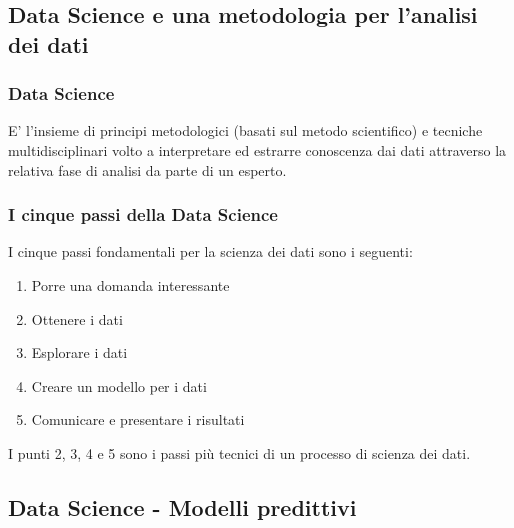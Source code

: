 \documentclass[../main.tex]{subfiles}
\begin{document}
	\subsection{Data Science e una metodologia per l’analisi dei dati}
	\subsubsection{Data Science}
	E’ l’insieme di principi metodologici (basati sul metodo scientifico) e tecniche multidisciplinari volto a interpretare ed estrarre conoscenza dai dati attraverso la relativa fase di analisi da parte di un esperto.
	\subsubsection{I cinque passi della Data Science}
	I cinque passi fondamentali per la scienza dei dati sono i seguenti:
	\begin{enumerate}
		\item Porre una domanda interessante
		\item Ottenere i dati
		\item Esplorare i dati
		\item Creare un modello per i dati
		\item Comunicare e presentare i risultati
	\end{enumerate}
	I punti 2, 3, 4 e 5 sono i passi più tecnici di un processo di scienza dei dati.
	\subsection{Data Science - Modelli predittivi}
\end{document}
